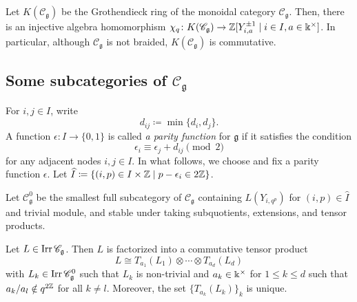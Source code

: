\begin{Prop}[{\cite[Theorem 3]{FR98}}]
\label{Prop : q-character}
Let $K(\mathscr{C}_{\mathfrak{g}})$ be the Grothendieck ring
of the monoidal category $\mathscr{C}_{\mathfrak{g}}$.
Then, there is an injective algebra homomorphism
$\chi_q \colon K(\mathscr{C}_{\mathfrak{g}}) \to
\mathbb{Z}[Y_{i, a}^{\pm 1} \mid i \in I, a \in \Bbbk^{\times}]$.
In particular, although $\mathscr{C}_{\mathfrak{g}}$ is not braided,
$K(\mathscr{C}_{\mathfrak{g}})$ is commutative.
\end{Prop}

\subsection{Some subcategories of $\mathscr{C}_{\mathfrak{g}}$}
\label{ssec : subcategories}

For $i, j \in I$, write
\[
d_{ij} \coloneq \min\{d_i, d_j\}.
\]
A function $\epsilon \colon I \to \{0, 1\}$
is called \emph{a parity function} for $\mathfrak{g}$
if it satisfies the condition
\[
\epsilon_i \equiv \epsilon_j + d_{ij} \pmod{2}
\]
for any adjacent nodes $i, j \in I$.
In what follows, we choose and fix a parity function $\epsilon$.
Let $\widehat{I} \coloneq
\{(i, p) \in I \times \mathbb{Z} \mid p - \epsilon_i \in 2\mathbb{Z}\}$.

\begin{Def}
\label{Def : Cg0}
Let $\mathscr{C}_{\mathfrak{g}}^{0}$ be the smallest full subcategory of
$\mathscr{C}_{\mathfrak{g}}$
containing $L(Y_{i, q^p})$ for $(i, p) \in \widehat{I}$
and trivial module, and stable under taking subquotients,
extensions, and tensor products.
\end{Def}

\begin{Prop}
\label{Prop : Cg factorization}
Let $L \in \mathop{\mathrm{Irr}}\nolimits\mathscr{C}_{\mathfrak{g}}$.
Then $L$ is factorized into a commutative tensor product
\[
L \cong T_{a_1}(L_1) \otimes \cdots \otimes T_{a_d}(L_d)
\]
with $L_k \in \mathop{\mathrm{Irr}}\nolimits\mathscr{C}_{\mathfrak{g}}^{0}$ such that $L_k$ is non-trivial and $a_k \in \Bbbk^{\times}$
for $1 \leq k \leq d$ such that
$a_k/a_l \notin q^{2\mathbb{Z}}$ for all $k \neq l$.
Moreover, the set $\{T_{a_k}(L_k)\}_k$ is unique. 
\end{Prop}

